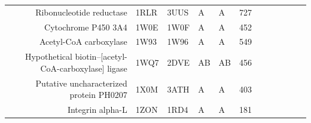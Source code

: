 \begin{table}
\begin{scriptsize}
\begin{tabular}{rrrrrrrrrrrr}
\multicolumn{1}{r}{Ribonucleotide reductase} & \multicolumn{1}{l}{1RLR} & \multicolumn{1}{l}{3UUS} & \multicolumn{1}{l}{A} & \multicolumn{1}{l}{A} & 727   & \cellcolor[rgb]{ .573,  .816,  .314}  & \cellcolor[rgb]{ .573,  .816,  .314}  & \cellcolor[rgb]{ 1,  .494,  .475}  & \cellcolor[rgb]{ 1,  .494,  .475}  & \cellcolor[rgb]{ .573,  .816,  .314}  & \cellcolor[rgb]{ 1,  .494,  .475}  \\
\multicolumn{1}{r}{Cytochrome P450 3A4} & \multicolumn{1}{l}{1W0E} & \multicolumn{1}{l}{1W0F} & \multicolumn{1}{l}{A} & \multicolumn{1}{l}{A} & 452   & \cellcolor[rgb]{ 1,  .494,  .475}  & \cellcolor[rgb]{ 1,  .494,  .475}  & \cellcolor[rgb]{ 1,  .494,  .475}  & \cellcolor[rgb]{ 1,  .494,  .475}  & \cellcolor[rgb]{ 1,  .494,  .475}  & \cellcolor[rgb]{ 1,  .494,  .475}  \\
\multicolumn{1}{r}{Acetyl-CoA carboxylase} & \multicolumn{1}{l}{1W93} & \multicolumn{1}{l}{1W96} & \multicolumn{1}{l}{A} & \multicolumn{1}{l}{A} & 549   & \cellcolor[rgb]{ .573,  .816,  .314}  & \cellcolor[rgb]{ 1,  .494,  .475}  & \cellcolor[rgb]{ .573,  .816,  .314}  & \cellcolor[rgb]{ .573,  .816,  .314}  & \cellcolor[rgb]{ 1,  .494,  .475}  & \cellcolor[rgb]{ .573,  .816,  .314}  \\
\multicolumn{1}{r}{Hypothetical biotin--[acetyl-CoA-carboxylase] ligase} & \multicolumn{1}{l}{1WQ7} & \multicolumn{1}{l}{2DVE} & \multicolumn{1}{l}{AB} & \multicolumn{1}{l}{AB} & 456   & \cellcolor[rgb]{ .573,  .816,  .314}  & \cellcolor[rgb]{ .573,  .816,  .314}  & \cellcolor[rgb]{ .573,  .816,  .314}  & \cellcolor[rgb]{ .573,  .816,  .314}  & \cellcolor[rgb]{ .573,  .816,  .314}  & \cellcolor[rgb]{ .573,  .816,  .314}  \\
\multicolumn{1}{r}{Putative uncharacterized protein PH0207} & \multicolumn{1}{l}{1X0M} & \multicolumn{1}{l}{3ATH} & \multicolumn{1}{l}{A} & \multicolumn{1}{l}{A} & 403   & \cellcolor[rgb]{ .573,  .816,  .314}  & \cellcolor[rgb]{ .573,  .816,  .314}  & \cellcolor[rgb]{ .573,  .816,  .314}  & \cellcolor[rgb]{ .573,  .816,  .314}  & \cellcolor[rgb]{ .573,  .816,  .314}  & \cellcolor[rgb]{ .573,  .816,  .314}  \\
\multicolumn{1}{r}{Integrin alpha-L} & \multicolumn{1}{l}{1ZON} & \multicolumn{1}{l}{1RD4} & \multicolumn{1}{l}{A} & \multicolumn{1}{l}{A} & 181   & \cellcolor[rgb]{ .573,  .816,  .314}  & \cellcolor[rgb]{ .573,  .816,  .314}  & \cellcolor[rgb]{ 1,  1,  0}  & \cellcolor[rgb]{ .573,  .816,  .314}  & \cellcolor[rgb]{ .573,  .816,  .314}  & \cellcolor[rgb]{ .573,  .816,  .314}  \\

\end{tabular}
\end{scriptsize}
\end{table}
